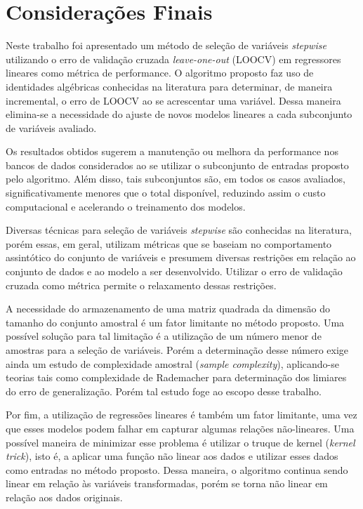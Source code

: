 \chapter[Considerações Finais]{Considerações Finais}

Neste trabalho foi apresentado um método de seleção de variáveis \textit{stepwise} utilizando o erro de validação cruzada \textit{leave-one-out} (LOOCV) em regressores lineares como métrica de performance. O algoritmo proposto faz uso de identidades algébricas conhecidas na literatura para determinar, de maneira incremental, o erro de LOOCV ao se acrescentar uma variável. Dessa maneira elimina-se a necessidade do ajuste de novos modelos lineares a cada subconjunto de variáveis avaliado.

Os resultados obtidos sugerem a manutenção ou melhora da performance nos bancos de dados considerados ao se utilizar o subconjunto de entradas proposto pelo algoritmo. Além disso, tais subconjuntos são, em todos os casos avaliados, significativamente menores que o total disponível, reduzindo assim o custo computacional e acelerando o treinamento dos modelos.

Diversas técnicas para seleção de variáveis \textit{stepwise} são conhecidas na literatura, porém essas, em geral, utilizam métricas que se baseiam no comportamento assintótico do conjunto de variáveis e presumem diversas restrições em relação ao conjunto de dados e ao modelo a ser desenvolvido. Utilizar o erro de validação cruzada como métrica permite o relaxamento dessas restrições.

A necessidade do armazenamento de uma matriz quadrada da dimensão do tamanho do conjunto amostral é um fator limitante no método proposto. Uma possível solução para tal limitação é a utilização de um número menor de amostras para a seleção de variáveis. Porém a determinação desse número exige ainda um estudo de complexidade amostral (\textit{sample complexity}), aplicando-se teorias tais como complexidade de Rademacher para determinação dos limiares do erro de generalização. Porém tal estudo foge ao escopo desse trabalho.

Por fim, a utilização de regressões lineares é também um fator limitante, uma vez que esses modelos podem falhar em capturar algumas relações não-lineares. Uma possível maneira de minimizar esse problema é utilizar o truque de kernel (\textit{kernel trick})\cite{peaking_phenomenon}, isto é, a aplicar uma função não linear aos dados e utilizar esses dados como entradas no método proposto. Dessa maneira, o algoritmo continua sendo linear em relação às variáveis transformadas, porém se torna não linear em relação aos dados originais.